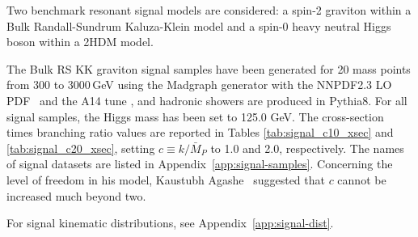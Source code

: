 
Two benchmark resonant signal models are considered: a spin-2 graviton within a Bulk Randall-Sundrum Kaluza-Klein model and a spin-0 heavy neutral Higgs boson within a 2HDM model. 

The Bulk RS KK graviton signal samples have been generated for 20 mass points from 300 to 3000\,GeV using the Madgraph generator\cite{MG5aMCatNLO} with the NNPDF2.3 LO PDF~\cite{Ball:2012cx} and the A14 tune \cite{ATL-PHYS-PUB-2014-021}, and hadronic showers are produced in Pythia8.  For all signal samples, the Higgs mass has been set to 125.0 GeV. The cross-section times branching ratio values are reported in Tables \ref{tab:signal_c10_xsec} and \ref{tab:signal_c20_xsec}, setting $c \equiv k/\bar{M}_P$ to 1.0 and 2.0, respectively.  The names of signal datasets are listed in Appendix~\ref{app:signal-samples}. Concerning the level of freedom in his model, Kaustubh Agashe~\cite{Agashe} suggested that $c$ cannot be increased much beyond two.

For signal kinematic distributions, see Appendix~\ref{app:signal-dist}.

